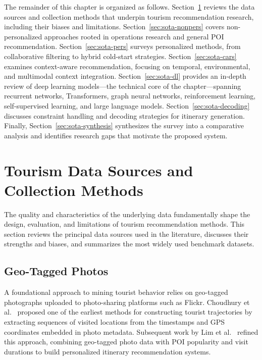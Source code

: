 The remainder of this chapter is organized as follows. Section~\ref{sec:sota-data} reviews the data sources and collection methods that underpin tourism recommendation research, including their biases and limitations. Section~\ref{sec:sota-nonpers} covers non-personalized approaches rooted in operations research and general POI recommendation. Section~\ref{sec:sota-pers} surveys personalized methods, from collaborative filtering to hybrid cold-start strategies. Section~\ref{sec:sota-cars} examines context-aware recommendation, focusing on temporal, environmental, and multimodal context integration. Section~\ref{sec:sota-dl} provides an in-depth review of deep learning models---the technical core of the chapter---spanning recurrent networks, Transformers, graph neural networks, reinforcement learning, self-supervised learning, and large language models. Section~\ref{sec:sota-decoding} discusses constraint handling and decoding strategies for itinerary generation. Finally, Section~\ref{sec:sota-synthesis} synthesizes the survey into a comparative analysis and identifies research gaps that motivate the proposed system.

\section{Tourism Data Sources and Collection Methods}
\label{sec:sota-data}

The quality and characteristics of the underlying data fundamentally shape the design, evaluation, and limitations of tourism recommendation methods. This section reviews the principal data sources used in the literature, discusses their strengths and biases, and summarizes the most widely used benchmark datasets.



\subsection{Geo-Tagged Photos}
\label{sec:sota-data-photos}

A foundational approach to mining tourist behavior relies on geo-tagged photographs uploaded to photo-sharing platforms such as Flickr. Choudhury et al.~\cite{choudhury2010photo} proposed one of the earliest methods for constructing tourist trajectories by extracting sequences of visited locations from the timestamps and GPS coordinates embedded in photo metadata. Subsequent work by Lim et al.~\cite{lim2015photo} refined this approach, combining geo-tagged photo data with POI popularity and visit durations to build personalized itinerary recommendation systems.


